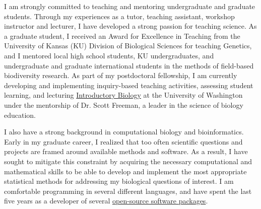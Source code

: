 \documentclass[letterpaper, 10pt]{letter}
\begin{document}
\begin{letter}
I am strongly committed to teaching and mentoring undergraduate and
graduate students.
Through my experiences as a tutor, teaching assistant, workshop instructor
and lecturer, I have developed a strong passion for teaching science.
As a graduate student, I received an Award for Excellence in Teaching from the
University of Kansas (KU) Division of Biological Sciences for teaching
Genetics, and I mentored local high school students, KU undergraduates, and
undergraduate and graduate international students in the methods of field-based
biodiversity research.
As part of my postdoctoral fellowship, I am currently developing and
implementing inquiry-based teaching activities, assessing student learning, and
lecturing \href{http://courses.biology.washington.edu/biol180/}{Introductory
    Biology} at the University of Washington under the mentorship of Dr. Scott
Freeman, a leader in the science of biology education.

I also have a strong background in computational biology and bioinformatics.
Early in my graduate career, I realized that too often scientific questions and
projects are framed around available methods and software.
As a result, I have sought to mitigate this constraint by acquiring the
necessary computational and mathematical skills to be able to develop and
implement the most appropriate statistical methods for addressing my biological
questions of interest.
I am comfortable programming in several different languages, and have spent the
last five years as a developer of several
\href{http://www.phyletica.com/?page_id=249}{open-source software packages}.



\end{letter}
\end{document}
